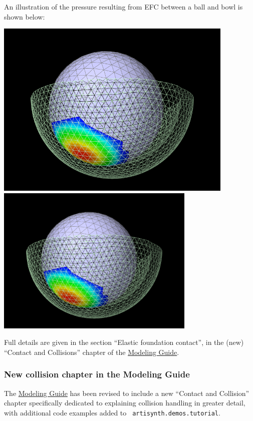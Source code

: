 \documentclass{article}
\begin{document}
An illustration of the pressure resulting from EFC between
a ball and bowl is shown below:
%
\begin{center}
\iflatexml
 \includegraphics[]{../modelguide/images/ElasticFoundationContact}
\else
 \includegraphics[width=3.75in]{../modelguide/images/ElasticFoundationContact}
\fi
\end{center}

Full details are given in the section ``Elastic foundation contact'',
in the (new) ``Contact and Collisions'' chapter of the
\href{http://www.artisynth.org/doc/pdf/modelguide.pdf}{Modeling
Guide}.

\subsubsection{New collision chapter in the Modeling Guide}

The \href{http://www.artisynth.org/doc/pdf/modelguide.pdf}{Modeling
Guide} has been revised to include a new ``Contact and Collision''
chapter specifically dedicated to explaining collision handling in
greater detail, with additional code examples added to {\tt
artisynth.demos.tutorial}.
\end{document}
